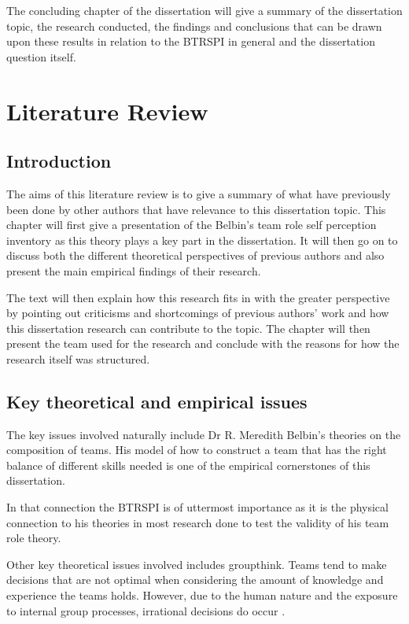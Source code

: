 \documentclass[a4paper,12pt,titlepage]{report}
\begin{document}
  The concluding chapter of the dissertation will give a summary of
  the dissertation topic, the research conducted, the findings
  and conclusions that can be drawn upon these results in relation
  to the BTRSPI in general and the dissertation question itself.

  \chapter{Literature Review}
  \section{Introduction}

  The aims of this literature review is to give a summary of what have previously
  been done by other authors that have relevance to this dissertation topic.
  This chapter will first give a presentation of the Belbin's team role self
  perception inventory as this theory plays a key part in the dissertation. It will
  then go on to discuss both the different theoretical perspectives of
  previous authors and also present the main empirical findings of their research. 

  The text will then explain how this research fits in with the greater perspective by
  pointing out criticisms and shortcomings of previous authors' work and how
  this dissertation research can contribute to the topic. The chapter will then present
  the team used for the research and conclude with the reasons for
  how the research itself was structured.

  \section{Key theoretical and empirical issues}
  The key issues involved naturally include Dr R. Meredith Belbin's theories
  on the composition of teams. His model of how to construct a team that
  has the right balance of different skills needed is one of the empirical
  cornerstones of this dissertation.

  In that connection the BTRSPI is
  of uttermost importance as it is the physical connection to his theories in most
  research done to test the validity of his team role theory.

  Other key theoretical issues involved includes groupthink. Teams tend
  to make decisions that are not optimal when considering the amount of knowledge
  and experience the teams holds. However, due to the human nature and
  the exposure to internal group processes, irrational decisions do
  occur \citep{mhsh,rb}.
\end{document}
